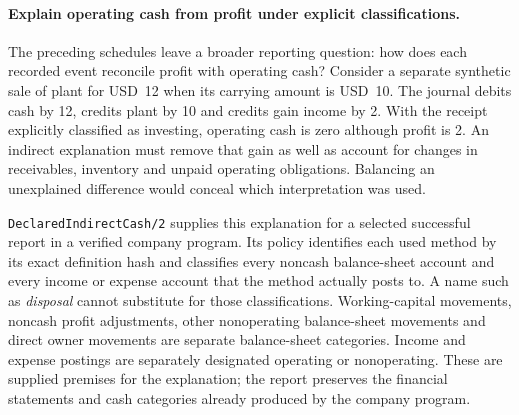 \paragraph{Explain operating cash from profit under explicit classifications.}
The preceding schedules leave a broader reporting question: how does each
recorded event reconcile profit with operating cash? Consider a separate
synthetic sale of plant for USD~12 when its carrying amount is USD~10. The
journal debits cash by 12, credits plant by 10 and credits gain income by 2.
With the receipt explicitly classified as investing, operating cash is zero
although profit is 2. An indirect explanation must remove that gain as well as
account for changes in receivables, inventory and unpaid operating obligations.
Balancing an unexplained difference would conceal which interpretation was used.

\texttt{DeclaredIndirectCash/2} supplies this explanation for a selected successful
report in a verified company program. Its policy identifies each used method
by its exact definition hash and classifies every noncash balance-sheet account
and every income or expense account that the method actually posts to. A name
such as \emph{disposal} cannot substitute for those classifications. Working-capital
movements, noncash profit adjustments, other nonoperating balance-sheet movements
and direct owner movements are separate balance-sheet categories. Income and
expense postings are separately designated operating or nonoperating. These are
supplied premises for the explanation; the report preserves the financial
statements and cash categories already produced by the company program.

